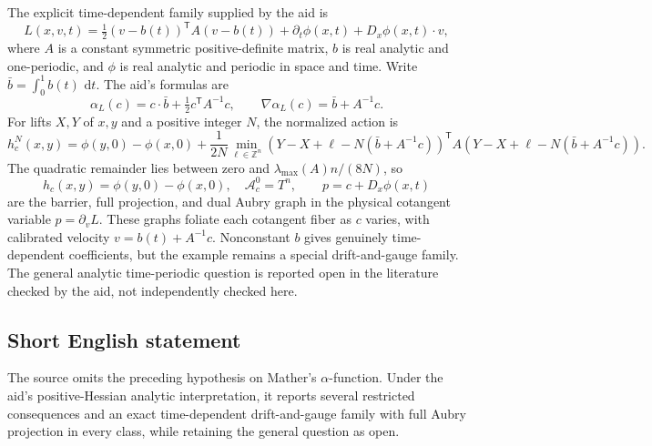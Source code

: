 \documentclass[11pt]{article}
\newcommand{\Z}{\mathbb{Z}}
\newcommand{\dd}{\,\mathrm{d}}
\begin{document}
The explicit time-dependent family supplied by the aid is
\[
 L(x,v,t)=\tfrac12(v-b(t))^{\mathsf T}A(v-b(t))
 +\partial_t\phi(x,t)+D_x\phi(x,t)\cdot v,
\]
where \(A\) is a constant symmetric positive-definite matrix, \(b\) is real analytic and one-periodic, and \(\phi\) is real analytic and periodic in space and time. Write \(\bar b=\int_0^1b(t)\,\dd t\). The aid's formulas are
\[
 \alpha_L(c)=c\cdot\bar b+\tfrac12c^{\mathsf T}A^{-1}c,\qquad
 \nabla\alpha_L(c)=\bar b+A^{-1}c.
\]
For lifts \(X,Y\) of \(x,y\) and a positive integer \(N\), the normalized action is
\[
 h_c^N(x,y)=\phi(y,0)-\phi(x,0)
 +\frac1{2N}\min_{\ell\in\Z^n}
 (Y-X+\ell-N(\bar b+A^{-1}c))^{\mathsf T}
 A(Y-X+\ell-N(\bar b+A^{-1}c)).
\]
The quadratic remainder lies between zero and \(\lambda_{\max}(A)n/(8N)\), so
\[
 h_c(x,y)=\phi(y,0)-\phi(x,0),\quad
 \mathcal A_c^0=T^n,
 \qquad p=c+D_x\phi(x,t)
\]
are the barrier, full projection, and dual Aubry graph in the physical cotangent variable \(p=\partial_vL\). These graphs foliate each cotangent fiber as \(c\) varies, with calibrated velocity \(v=b(t)+A^{-1}c\). Nonconstant \(b\) gives genuinely time-dependent coefficients, but the example remains a special drift-and-gauge family. The general analytic time-periodic question is reported open in the literature checked by the aid, not independently checked here.
\subsection{Short English statement}
The source omits the preceding hypothesis on Mather's \(\alpha\)-function. Under the aid's positive-Hessian analytic interpretation, it reports several restricted consequences and an exact time-dependent drift-and-gauge family with full Aubry projection in every class, while retaining the general question as open.
\end{document}
